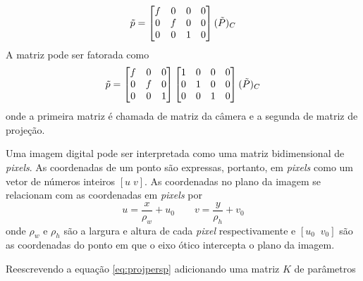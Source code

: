 \begin{equation} \label{eq:projpersp}
\tilde{{p}} = \begin{bmatrix}
    f & 0 & 0 & 0 \\
    0 & f & 0 & 0 \\
    0 & 0 & 1 & 0
\end{bmatrix} (\tilde{{P}})_C
\end{equation}
A matriz pode ser fatorada como %
\begin{equation}
\tilde{{p}} = \begin{bmatrix}
    f & 0 & 0 \\
    0 & f & 0 \\
    0 & 0 & 1 
\end{bmatrix} 
\begin{bmatrix}
    1 & 0 & 0 & 0 \\
    0 & 1 & 0 & 0 \\
    0 & 0 & 1 & 0
\end{bmatrix}(\tilde{{P}})_C
\end{equation}
onde a primeira matriz é chamada de matriz da câmera e a segunda de matriz de projeção.

Uma imagem digital pode ser interpretada como uma matriz bidimensional de \textit{pixels}. As coordenadas de um ponto são expressas, portanto, em \textit{pixels} como um vetor de números inteiros $[u\; v]$. As coordenadas no plano da imagem se relacionam com as coordenadas em \textit{pixels} por
\begin{equation}
u =  \frac{x}{\rho_w} + u_0 \qquad v = \frac{y}{\rho_h} + v_0
\end{equation}
onde $\rho_w$ e $\rho_h$ são a largura e altura de cada \textit{pixel} respectivamente e $[u_0\;\; v_0]$ são as coordenadas do ponto em que o eixo ótico intercepta o plano da imagem.

Reescrevendo a equação \eqref{eq:projpersp} adicionando uma matriz ${K}$ de parâmetros

